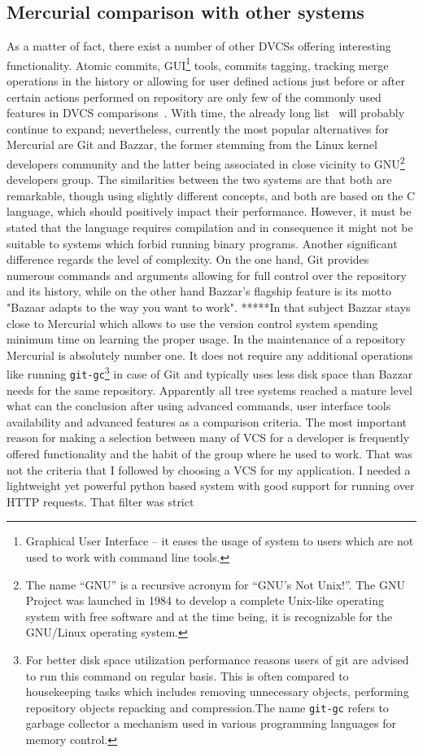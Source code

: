 \subsection{Mercurial comparison with other systems}\label{subsec:dvcs_compare}
As a matter of fact, there exist a number of other DVCSs offering interesting functionality. Atomic commits, GUI\footnote{Graphical User Interface -- it eases the usage of system to users which are not used to work with command line tools.} tools, commits tagging, tracking merge operations in the history or allowing for user defined actions just before or after certain actions performed on repository are only few of the commonly used features in DVCS comparisons~\cite{wiki_dvcs_compare}. With time, the already long list~\cite{wiki_dvcs_list} will probably continue to expand; nevertheless, currently the most popular alternatives for Mercurial are Git and Bazzar, the former stemming from the Linux kernel developers community and the latter being associated in close vicinity to GNU\footnote{The name “GNU” is a recursive acronym for “GNU's Not Unix!”. The GNU Project was launched in 1984 to develop a complete Unix-like operating system with free software and at the time being, it is recognizable for the GNU/Linux operating system.} developers group. The similarities between the two systems are that both are remarkable, though using slightly different concepts, and both are based on the C language, which should positively impact their performance. However, it must be stated that the language requires compilation and in consequence it might not be suitable to systems which forbid running binary programs. Another significant difference regards the level of complexity. On the one hand, Git provides numerous commands and arguments allowing for full control over the repository and its history, while on the other hand Bazzar's flagship feature is its motto "Bazaar adapts to the way you want to work". *****In that subject Bazzar stays close to Mercurial which allows to use the version control system spending minimum time on learning the proper usage. In the maintenance of a repository Mercurial is absolutely number one. It does not require any additional operations like running \texttt{git-gc}\footnote{For better disk space utilization performance reasons users of git are advised to run this command on regular basis. This is often compared to housekeeping tasks which includes removing unnecessary objects, performing repository objects repacking and compression.The name \texttt{git-gc} refers to garbage collector a mechanism used in various programming languages for memory control.} in case of Git and typically uses less disk space than Bazzar needs for the same repository. Apparently all tree systems reached a mature level what can the conclusion after using advanced commands, user interface tools availability and  advanced features as a comparison criteria. The most important reason for making a selection between many of VCS for a developer is frequently offered functionality and the habit of the group where he used to work. That was not the criteria that I followed by choosing a VCS for my application. I needed a lightweight yet powerful python based system with good support for running over HTTP requests. That filter was strict 